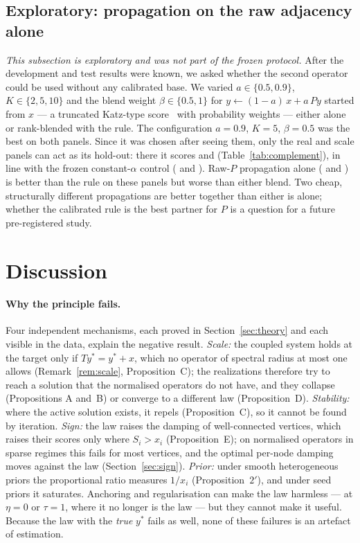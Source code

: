 \documentclass[11pt,a4paper]{article}
\theoremstyle{definition}
\theoremstyle{plain}
\begin{document}
\TabCost

\TabSweep

\subsection{Exploratory: propagation on the raw adjacency alone}\label{sec:explore}

\emph{This subsection is exploratory and was not part of the frozen protocol.} After the development and test results were known, we asked whether the second operator could be used without any calibrated base. We varied $a\in\{0.5,0.9\}$, $K\in\{2,5,10\}$ and the blend weight $\beta\in\{0.5,1\}$ for $y\leftarrow(1-a)\,x+a\,Py$ started from $x$ --- a truncated Katz-type score~\cite{katz53} with probability weights --- either alone or rank-blended with the rule. The configuration $a=0.9$, $K=5$, $\beta=0.5$ was the best on both panels. Since it was chosen after seeing them, only the real and scale panels can act as its hold-out: there it scores \BlendReal{} and \BlendScale{} (Table~\ref{tab:complement}), in line with the frozen constant-$\alpha$ control (\RealLinNine{} and \ScaleLinNine). Raw-$P$ propagation alone (\RawPReal{} and \RawPScale) is better than the rule on these panels but worse than either blend. Two cheap, structurally different propagations are better together than either is alone; whether the calibrated rule is the best partner for $P$ is a question for a future pre-registered study.

\FloatBarrier
\section{Discussion}\label{sec:discussion}

\paragraph{Why the principle fails.} Four independent mechanisms, each proved in Section~\ref{sec:theory} and each visible in the data, explain the negative result. \emph{Scale:} the coupled system holds at the target only if $Ty^*=y^*+x$, which no operator of spectral radius at most one allows (Remark~\ref{rem:scale}, Proposition~C); the realizations therefore try to reach a solution that the normalised operators do not have, and they collapse (Propositions A and~B) or converge to a different law (Proposition~D). \emph{Stability:} where the active solution exists, it repels (Proposition~C), so it cannot be found by iteration. \emph{Sign:} the law raises the damping of well-connected vertices, which raises their scores only where $S_i>x_i$ (Proposition~E); on normalised operators in sparse regimes this fails for most vertices, and the optimal per-node damping moves against the law (Section~\ref{sec:sign}). \emph{Prior:} under smooth heterogeneous priors the proportional ratio measures $1/x_i$ (Proposition~$2'$), and under seed priors it saturates. Anchoring and regularisation can make the law harmless --- at $\eta=0$ or $\tau=1$, where it no longer is the law --- but they cannot make it useful. Because the law with the \emph{true} $y^*$ fails as well, none of these failures is an artefact of estimation.
\end{document}
